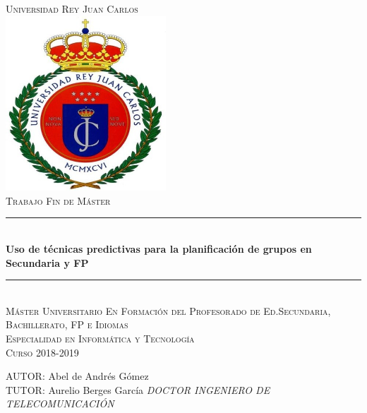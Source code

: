 \documentclass[spanish,12pt,a4paper,twoside,openright]{report}
\newcommand\blankpage{%
	\null
	\thispagestyle{empty}%
	\addtocounter{page}{-1}%
	\newpage}
\begin{document}
\begin{titlepage}
	
	\newcommand{\HRule}{\rule{\linewidth}{0.5mm}} %
	
	
	
	
	
	\center %
	\vspace*{0pt}
	\textsc{\huge Universidad Rey Juan Carlos }
	\\[1cm]
	
	\includegraphics[width=6cm]{recursos/escudo_urjc}
	\\[1cm]
	
	\textsc{\Large Trabajo Fin de Máster }\\[0.2cm]
	\HRule \\[0.4cm]
	{ \Huge \bfseries Uso de técnicas predictivas para la planificación de grupos en Secundaria y FP}\\[0.2cm] %
	\HRule \\[1cm]
	
	\textsc{\Large Máster Universitario En Formación del Profesorado de Ed.Secundaria, Bachillerato, FP e Idiomas }\\[0.7cm]
	\textsc{\Large Especialidad en Informática y Tecnología }\\[1cm]
	\textsc{\Large Curso 2018-2019}\\[1cm]
	
	\begin{flushright}
		\large
		AUTOR: Abel de Andrés Gómez\\
		TUTOR: Aurelio Berges García\linebreak 
				{\small \textit{DOCTOR INGENIERO DE TELECOMUNICACIÓN}}
	\end{flushright}
	
	
	\vfill %
	
\end{titlepage}
\blankpage
\end{document}
